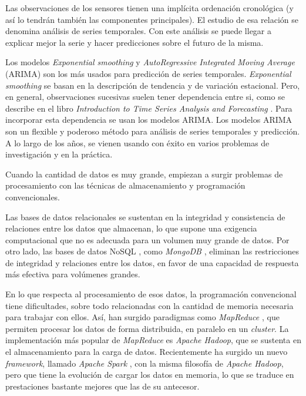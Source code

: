 \documentclass[11pt,spanish,listoffigures,listoftables]{tfgetsinf}
\begin{document}
Las observaciones de los sensores tienen una implícita ordenación cronológica (y así lo tendrán también las componentes principales). El estudio de esa relación se denomina análisis de series temporales. Con este análisis se puede llegar a explicar mejor la serie y hacer predicciones sobre el futuro de la misma. 

Los modelos {\em Exponential smoothing} y {\em AutoRegressive Integrated Moving Average} (ARIMA) son los más usados para predicción de series temporales. {\em Exponential smoothing} se basan en la descripción de tendencia y de variación estacional. Pero, en general, observaciones sucesivas suelen tener dependencia entre si, como se describe en el libro \textit{Introduction to Time Series Analysis and Forecasting} \cite{montgomery}. Para incorporar esta dependencia se usan los modelos ARIMA. Los modelos ARIMA son un flexible y poderoso método para análisis de series temporales y predicción. A lo largo de los años, se vienen usando con éxito en varios problemas de investigación y en la práctica.

Cuando la cantidad de datos es muy grande, empiezan a surgir problemas de procesamiento con las técnicas de almacenamiento y programación convencionales. 

Las bases de datos relacionales se sustentan en la integridad y consistencia de relaciones entre los datos que almacenan, lo que supone una exigencia computacional que no es adecuada para un volumen muy grande de datos. Por otro lado, las bases de datos NoSQL \cite{nosql}, como {\em MongoDB} \cite{mongodb}, eliminan las restricciones de integridad y relaciones entre los datos, en favor de una capacidad de respuesta más efectiva para volúmenes grandes. 

En lo que respecta al procesamiento de esos datos, la programación convencional tiene dificultades, sobre todo relacionadas con la cantidad de memoria necesaria para trabajar con ellos. Así, han surgido paradigmas como {\em MapReduce} \cite{mapreduce}, que permiten procesar los datos de forma distribuida, en paralelo en un {\em cluster}. La implementación más popular de {\em MapReduce} es {\em Apache Hadoop}, que se sustenta en el almacenamiento para la carga de datos. Recientemente ha surgido un nuevo {\em framework}, llamado {\em Apache Spark} \cite{spark}, con la misma filosofía de {\em Apache Hadoop}, pero que tiene la evolución de cargar los datos en memoria, lo que se traduce en prestaciones bastante mejores que las de su antecesor.


\end{document}
